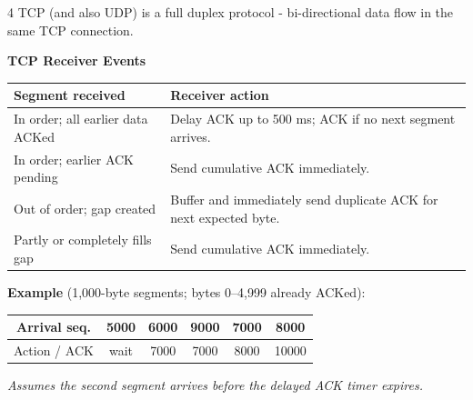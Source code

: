 \documentclass[10pt]{extarticle}
\begin{document}
\begin{multicols}{4}
TCP (and also UDP) is a full duplex protocol - bi-directional data flow in the same TCP connection.

\par\vspace{1pt}\noindent\begingroup\scriptsize
\textbf{TCP Receiver Events}\par
\begingroup\setlength{\tabcolsep}{3pt}\renewcommand{\arraystretch}{.95}
\begin{tabular}{|>{\raggedright\arraybackslash}p{.39\linewidth}|>{\raggedright\arraybackslash}p{.52\linewidth}|}
\hline
\textbf{Segment received} & \textbf{Receiver action} \\
\hline
In order; all earlier data ACKed & Delay ACK up to 500 ms; ACK if no next segment arrives. \\
\hline
In order; earlier ACK pending & Send cumulative ACK immediately. \\
\hline
Out of order; gap created & Buffer and immediately send duplicate ACK for next expected byte. \\
\hline
Partly or completely fills gap & Send cumulative ACK immediately. \\
\hline
\end{tabular}\par\endgroup
\vspace{1pt}
\textbf{Example} (1,000-byte segments; bytes 0--4,999 already ACKed):\par
\begingroup\setlength{\tabcolsep}{2pt}\renewcommand{\arraystretch}{.95}
\begin{tabular}{|c|c|c|c|c|c|}
\hline
Arrival seq. & 5000 & 6000 & 9000 & 7000 & 8000 \\
\hline
Action / ACK & wait & 7000 & 7000 & 8000 & 10000 \\
\hline
\end{tabular}\par\endgroup
\textit{Assumes the second segment arrives before the delayed ACK timer expires.}\par\endgroup


\end{multicols}
\end{document}
